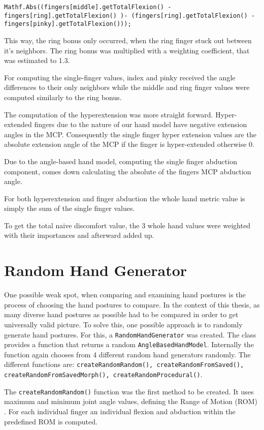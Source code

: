\texttt{Mathf.Abs((fingers[middle].getTotalFlexion() - fingers[ring].getTotalFlexion() )- (fingers[ring].getTotalFlexion() - fingers[pinky].getTotalFlexion()));}

This way, the ring bonus only occurred, when the ring finger stuck out between it's neighbors. The ring bonus was multiplied with a weighting coefficient, that was estimated to 1.3.

For computing the single-finger values, index and pinky received the angle differences to their only neighbors while the middle and ring finger values were computed similarly to the ring bonus. 

The computation of the hyperextension was more straight forward. Hyper-extended fingers due to the nature of our hand model have negative extension angles in the MCP. Consequently the single finger hyper extension values are the absolute extension angle of the MCP if the finger is hyper-extended otherwise 0. 

Due to the angle-based hand model, computing the single finger abduction component, comes down calculating the absolute of the fingers MCP abduction angle.

For both hyperextension and finger abduction the whole hand metric value is simply the sum of the single finger values. 

To get the total naive discomfort value, the 3 whole hand values were weighted with their importances and afterward added up.

\section{Random Hand Generator}

One possible weak spot, when comparing and examining hand postures is the process of choosing the hand postures to compare. In the context of this thesis, as many diverse hand postures as possible had to be compared in order to get universally valid picture. To solve this, one possible approach is to randomly generate hand postures. 
For this, a \texttt{RandomHandGenerator} was created. The class provides a function that returns a random \texttt{AngleBasedHandModel}. Internally the function again chooses from 4 different random hand generators randomly. The different functions are: \texttt{createRandomRandom(), createRandomFromSaved(), createRandomFromSavedMorph(), createRandomProcedural()}. 

The \texttt{createRandomRandom()} function was the first method to be created. It uses maximum and minimum joint angle values, defining the Range of Motion (ROM) \cite{apostolico2014postura}. For each individual finger an individual flexion and abduction within the predefined ROM is computed.

